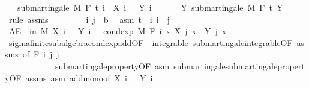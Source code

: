 \begin{isabellebody}
\ \ \ {\isachardoublequoteopen}submartingale\ M\ F\ t\ {\isacharparenleft}{\kern0pt}{\isasymlambda}i\ {\isasymxi}{\isachardot}{\kern0pt}\ X\ i\ {\isasymxi}\ {\isacharplus}{\kern0pt}\ Y\ i\ {\isasymxi}{\isacharparenright}{\kern0pt}{\isachardoublequoteclose}\isanewline
%
\isadelimproof
%
\endisadelimproof
%
\isatagproof
{}\isamarkupfalse%
\ {\isacharminus}{\kern0pt}\isanewline
\ \ \isamarkupfalse%
\ Y{\isacharcolon}{\kern0pt}\ submartingale\ M\ F\ t\ Y\ \isamarkupfalse%
\ {\isacharparenleft}{\kern0pt}rule\ assms{\isacharparenright}{\kern0pt}\isanewline
\ \ \isacommand{{\isacharbraceleft}{\kern0pt}}\isamarkupfalse%
\isanewline
\ \ \ \ \isamarkupfalse%
\ i\ j\ {\isacharcolon}{\kern0pt}{\isacharcolon}{\kern0pt}\ {\isacharprime}{\kern0pt}b\ \isamarkupfalse%
\ asm{\isacharcolon}{\kern0pt}\ {\isachardoublequoteopen}t\ {\isasymle}\ i{\isachardoublequoteclose}\ {\isachardoublequoteopen}i\ {\isasymle}\ j{\isachardoublequoteclose}\isanewline
\ \ \ \ \isamarkupfalse%
\ {\isachardoublequoteopen}AE\ {\isasymxi}\ in\ M{\isachardot}{\kern0pt}\ X\ i\ {\isasymxi}\ {\isacharplus}{\kern0pt}\ Y\ i\ {\isasymxi}\ {\isasymle}\ cond{\isacharunderscore}{\kern0pt}exp\ M\ {\isacharparenleft}{\kern0pt}F\ i{\isacharparenright}{\kern0pt}\ {\isacharparenleft}{\kern0pt}{\isasymlambda}x{\isachardot}{\kern0pt}\ X\ j\ x\ {\isacharplus}{\kern0pt}\ Y\ j\ x{\isacharparenright}{\kern0pt}\ {\isasymxi}{\isachardoublequoteclose}\ \isanewline
\ \ \ \ \ \ \isamarkupfalse%
\ sigma{\isacharunderscore}{\kern0pt}finite{\isacharunderscore}{\kern0pt}subalgebra{\isachardot}{\kern0pt}cond{\isacharunderscore}{\kern0pt}exp{\isacharunderscore}{\kern0pt}add{\isacharbrackleft}{\kern0pt}OF\ {\isacharunderscore}{\kern0pt}\ integrable\ submartingale{\isachardot}{\kern0pt}integrable{\isacharbrackleft}{\kern0pt}OF\ assms{\isacharbrackright}{\kern0pt}{\isacharcomma}{\kern0pt}\ of\ {\isachardoublequoteopen}F\ i{\isachardoublequoteclose}\ j\ j{\isacharbrackright}{\kern0pt}\ \isanewline
\ \ \ \ \ \ \ \ \ \ \ \ submartingale{\isacharunderscore}{\kern0pt}property{\isacharbrackleft}{\kern0pt}OF\ asm{\isacharbrackright}{\kern0pt}\ submartingale{\isachardot}{\kern0pt}submartingale{\isacharunderscore}{\kern0pt}property{\isacharbrackleft}{\kern0pt}OF\ assms\ asm{\isacharbrackright}{\kern0pt}\ add{\isacharunderscore}{\kern0pt}mono{\isacharbrackleft}{\kern0pt}of\ {\isachardoublequoteopen}X\ i\ {\isacharunderscore}{\kern0pt}{\isachardoublequoteclose}\ {\isacharunderscore}{\kern0pt}\ {\isachardoublequoteopen}Y\ i\ {\isacharunderscore}{\kern0pt}{\isachardoublequoteclose}{\isacharbrackright}{\kern0pt}\ \isamarkupfalse%

\end{isabellebody}
